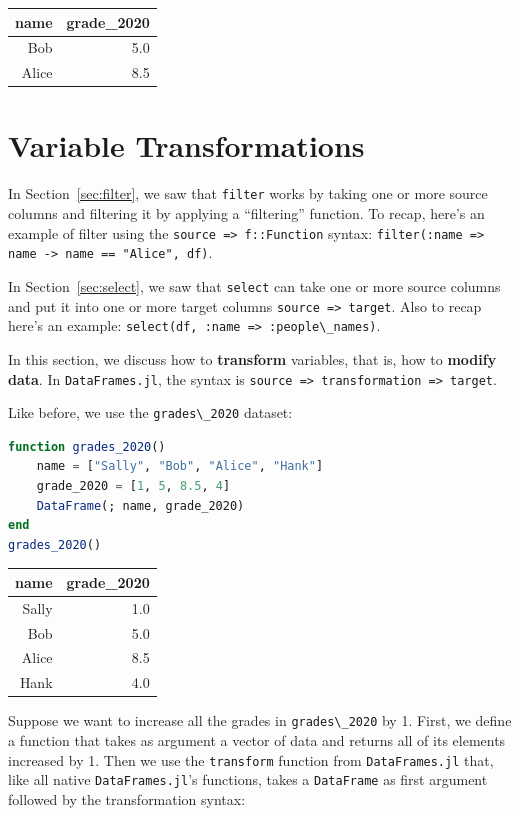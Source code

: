 \documentclass[
  notoc %
]{tufte-book}
\newcommand{\passthrough}[1]{#1}
\begin{document}
\begin{longtable}[]{@{}rr@{}}
\toprule()
name & grade\_2020 \\
\midrule()
\endhead
Bob & 5.0 \\
Alice & 8.5 \\
\bottomrule()
\end{longtable}

\hypertarget{sec:transform}{%
\section{Variable Transformations}\label{sec:transform}}

In Section~\ref{sec:filter}, we saw that
\passthrough{\lstinline!filter!} works by taking one or more source
columns and filtering it by applying a ``filtering'' function. To recap,
here's an example of filter using the
\passthrough{\lstinline!source => f::Function!} syntax:
\passthrough{\lstinline!filter(:name => name -> name == "Alice", df)!}.

In Section~\ref{sec:select}, we saw that
\passthrough{\lstinline!select!} can take one or more source columns and
put it into one or more target columns
\passthrough{\lstinline!source => target!}. Also to recap here's an
example: \passthrough{\lstinline!select(df, :name => :people\_names)!}.

In this section, we discuss how to \textbf{transform} variables, that
is, how to \textbf{modify data}. In
\passthrough{\lstinline!DataFrames.jl!}, the syntax is
\passthrough{\lstinline!source => transformation => target!}.

Like before, we use the \passthrough{\lstinline!grades\_2020!} dataset:

\begin{lstlisting}[language=Julia]
function grades_2020()
    name = ["Sally", "Bob", "Alice", "Hank"]
    grade_2020 = [1, 5, 8.5, 4]
    DataFrame(; name, grade_2020)
end
grades_2020()
\end{lstlisting}

\begin{longtable}[]{@{}rr@{}}
\toprule()
name & grade\_2020 \\
\midrule()
\endhead
Sally & 1.0 \\
Bob & 5.0 \\
Alice & 8.5 \\
Hank & 4.0 \\
\bottomrule()
\end{longtable}

Suppose we want to increase all the grades in
\passthrough{\lstinline!grades\_2020!} by 1. First, we define a function
that takes as argument a vector of data and returns all of its elements
increased by 1. Then we use the \passthrough{\lstinline!transform!}
function from \passthrough{\lstinline!DataFrames.jl!} that, like all
native \passthrough{\lstinline!DataFrames.jl!}'s functions, takes a
\passthrough{\lstinline!DataFrame!} as first argument followed by the
transformation syntax:
\end{document}
